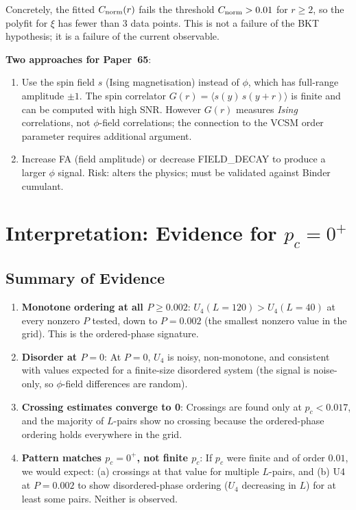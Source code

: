 \documentclass[12pt,a4paper]{article}
\begin{document}
Concretely, the fitted $C_{\rm norm}(r)$ fails the threshold $C_{\rm norm} > 0.01$
for $r \geq 2$, so the polyfit for $\xi$ has fewer than 3 data points.
This is not a failure of the BKT hypothesis; it is a failure of the
current observable.

\textbf{Two approaches for Paper~65}:
\begin{enumerate}
  \item Use the spin field $s$ (Ising magnetisation) instead of $\phi$,
        which has full-range amplitude $\pm 1$.
        The spin correlator $G(r) = \langle s(y)\,s(y+r)\rangle$ is finite
        and can be computed with high SNR.
        However $G(r)$ measures \emph{Ising} correlations, not $\phi$-field correlations;
        the connection to the VCSM order parameter requires additional argument.
  \item Increase FA (field amplitude) or decrease FIELD\_DECAY
        to produce a larger $\phi$ signal.
        Risk: alters the physics; must be validated against Binder cumulant.
\end{enumerate}

\section{Interpretation: Evidence for $p_c = 0^+$}

\subsection{Summary of Evidence}

\begin{enumerate}
  \item \textbf{Monotone ordering at all $P \geq 0.002$}:
    $U_4(L=120) > U_4(L=40)$ at every nonzero $P$ tested,
    down to $P = 0.002$ (the smallest nonzero value in the grid).
    This is the ordered-phase signature.

  \item \textbf{Disorder at $P = 0$}:
    At $P = 0$, $U_4$ is noisy, non-monotone, and consistent with
    values expected for a finite-size disordered system
    (the signal is noise-only, so $\phi$-field differences are random).

  \item \textbf{Crossing estimates converge to 0}:
    Crossings are found only at $p_c < 0.017$,
    and the majority of $L$-pairs show no crossing
    because the ordered-phase ordering holds everywhere in the grid.

  \item \textbf{Pattern matches $p_c = 0^+$, not finite $p_c$}:
    If $p_c$ were finite and of order $0.01$, we would expect:
    (a) crossings at that value for multiple $L$-pairs, and
    (b) U4 at $P = 0.002$ to show disordered-phase ordering ($U_4$ decreasing in $L$)
    for at least some pairs.
    Neither is observed.
\end{enumerate}
\end{document}
